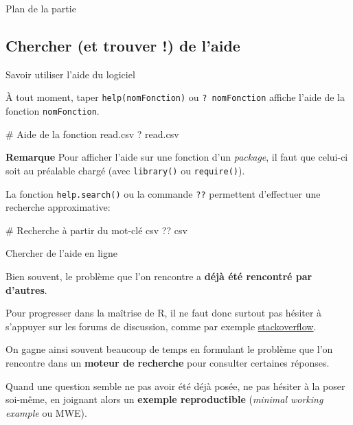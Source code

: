 \documentclass[12pt,handout,ignorenonframetext,]{beamer}
\newenvironment{Shaded}{}{}
\newcommand{\CommentTok}[1]{\textcolor[rgb]{0.00,0.50,0.00}{{#1}}}
\newcommand{\NormalTok}[1]{{#1}}
\renewenvironment{Shaded}{\begin{snugshade}}{\end{snugshade}}
\begin{document}
\begin{frame}{Plan de la partie}

\Large 
\tableofcontents[currentsection, sectionstyle = hide, subsectionstyle = show/show/hide]

\end{frame}

\subsection{Chercher (et trouver !) de
l'aide}\label{chercher-et-trouver-de-laide}

\begin{frame}[fragile]{Savoir utiliser l'aide du logiciel}

À tout moment, taper \texttt{help(nomFonction)} ou
\texttt{?\ nomFonction} affiche l'aide de la fonction
\texttt{nomFonction}.

\begin{Shaded}
\begin{Highlighting}[]
\CommentTok{# Aide de la fonction read.csv}
\NormalTok{? read.csv}
\end{Highlighting}
\end{Shaded}

\pause 

\textbf{Remarque} Pour afficher l'aide sur une fonction d'un
\emph{package}, il faut que celui-ci soit au préalable chargé (avec
\texttt{library()} ou \texttt{require()}).

\pause La fonction \texttt{help.search()} ou la commande \texttt{??}
permettent d'effectuer une recherche approximative:

\begin{Shaded}
\begin{Highlighting}[]
\CommentTok{# Recherche à partir du mot-clé csv}
\NormalTok{?? csv}
\end{Highlighting}
\end{Shaded}

\end{frame}

\begin{frame}{Chercher de l'aide en ligne}

Bien souvent, le problème que l'on rencontre a \textbf{déjà été
rencontré par d'autres}.

\bigskip
Pour progresser dans la maîtrise de R, il ne faut donc surtout pas
hésiter à s'appuyer sur les forums de discussion, comme par exemple
\href{http://stackoverflow.com/questions/tagged/r}{\underline{stackoverflow}}.

\pause \bigskip
On gagne ainsi souvent beaucoup de temps en formulant le problème que
l'on rencontre dans un \textbf{moteur de recherche} pour consulter
certaines réponses.

\bigskip  Quand une question semble ne pas avoir été déjà posée, ne pas
hésiter à la poser soi-même, en joignant alors un \textbf{exemple
reproductible} (\emph{minimal working example} ou MWE).

\end{frame}
\end{document}
